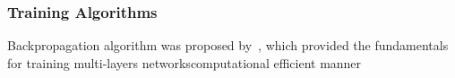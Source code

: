\subsubsection{Training Algorithms}
Backpropagation algorithm was proposed by~\citet{werbos1975beyond}, which provided the fundamentals for training multi-layers networkscomputational efficient manner